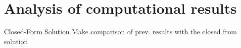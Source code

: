 \section{Analysis of computational results}

\begin{frame}{Closed-Form Solution}
    Make comparison of prev. results with the closed from solution
\end{frame}
